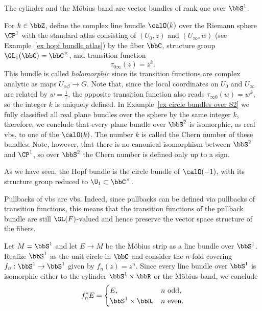 \begin{example}
The cylinder and the M\"obius band are vector bundles of rank one over $\bbS^1$.
\end{example}

\begin{example}\label{ex holomorphic bundle O(k)}
    For $k\in\bbZ$, define the complex line bundle $\calO(k)$ over the Riemann sphere $\CP^1$ with the standard atlas consisting of $(U_0,z)$ and $(U_\infty,w)$ (see Example~\ref{ex hopf bundle atlas}) by the fiber $\bbC$, structure group $\GL_1(\bbC)=\bbC^\times$, and transition function
    \[\tau_{0\infty}(z)=z^k.\]
    This bundle is called \emph{holomorphic} since its transition functions are complex analytic as maps $U_{\alpha\beta}\to G$.
    Note that, since the local coordinates on $U_0$ and $U_\infty$ are related by $w=\frac{1}{z}$, the opposite transition function also reads $\tau_{\infty 0}(w)=w^k$, so the integer $k$ is uniquely defined. In Example~\ref{ex circle bundles over S2} we fully classified all real plane bundles over the sphere by the same integer $k$, therefore, we conclude that every plane bundle over $\bbS^2$ is isomorphic, as real \glspl{vb}, to one of the $\calO(k)$. The number $k$ is called the Chern number of these bundles. Note, however, that there is no canonical isomorphism between $\bbS^2$ and $\CP^1$, so over $\bbS^2$ the Chern number is defined only up to a sign.
    
    As we have seen, the Hopf bundle is the circle bundle of $\calO(-1)$, with its structure group reduced to $\U_1\subset \bbC^\times$.
\end{example}


\begin{rem}
    Pullbacks of \glspl{vb} are \glspl{vb}. Indeed, since pullbacks can be defined via pullbacks of transition functions, this means that the transition functions of the pullback bundle are still $\GL(F)$-valued and hence preserve the vector space structure of the fibers.
\end{rem}


\begin{example}
    Let $M=\bbS^1$ and let $E\to M$ be the M\"obius strip as a line bundle over $\bbS^1$. Realize $\bbS^1$ as the unit circle in $\bbC$ and consider the $n$-fold covering $f_n:\bbS^1\to \bbS^1$ given by $f_n(z)=z^n$. Since every line bundle over $\bbS^1$ is isomorphic either to the cylinder $\bbS^1\times \bbR$ or the M\"obius band, we conclude
    \[f_n^\ast E=\begin{cases}
        E,& n\text{ odd},\\
        \bbS^1\times\bbR,& n\text{ even}.
    \end{cases}\]
\end{example}



